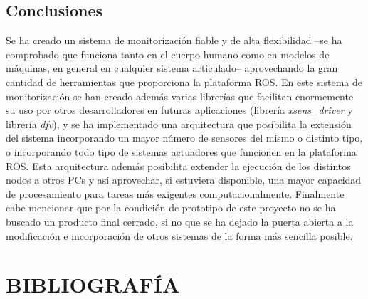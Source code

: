 \documentclass[12pt, a4paper]{report}
\begin{document}
\section{Conclusiones}

Se ha creado un sistema de monitorización fiable y de alta flexibilidad --se ha comprobado que funciona tanto en el cuerpo humano como en modelos de máquinas, en general en cualquier sistema articulado-- aprovechando la gran cantidad de herramientas que proporciona la plataforma ROS. En este sistema de monitorización se han creado además varias librerías que facilitan enormemente su uso por otros desarrolladores en futuras aplicaciones (librería \textit{xsens\_driver} y librería \textit{dfv}), y se ha implementado una arquitectura que posibilita la extensión del sistema incorporando un mayor número de sensores del mismo o distinto tipo, o incorporando todo tipo de sistemas actuadores que funcionen en la plataforma ROS. Esta arquitectura además posibilita extender la ejecución de los distintos nodos a otros PCs y así aprovechar, si estuviera disponible, una mayor capacidad de procesamiento para tareas más exigentes computacionalmente. Finalmente cabe mencionar que por la condición de prototipo de este proyecto no se ha buscado un producto final cerrado, si no que se ha dejado la puerta abierta a la modificación e incorporación de otros sistemas de la forma más sencilla posible. 

\chapter{BIBLIOGRAFÍA}
\end{document}
